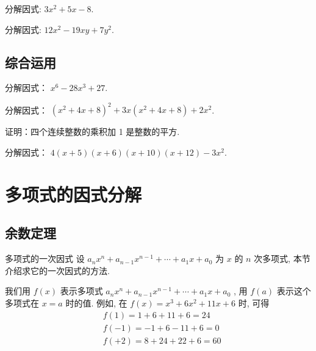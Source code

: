 \documentclass[aspectratio=169]{ctexbeamer}
\theoremstyle{definition}
\begin{document}
\begin{frame}[t]
	\begin{example}
		分解因式: $3 x^{2}+5 x-8$.
	\end{example}
\end{frame}

\begin{frame}[t]
	\begin{example}
		分解因式: $12 x^{2}-19 x y+7 y^{2}$.
	\end{example}
\end{frame}

\subsection{综合运用}
\begin{frame}[t]
	\begin{example}[换元]
		分解因式： $x^{6}-28 x^{3}+27.$
	\end{example}
\end{frame}

\begin{frame}[t]
	\begin{example}
		分解因式： $\left(x^{2}+4 x+8\right)^{2}+3 x\left(x^{2}+4 x+8\right)+2 x^{2}$.
	\end{example}
\end{frame}

\begin{frame}[t]
	\begin{example}
		证明：四个连续整数的乘积加 1 是整数的平方.
	\end{example}
\end{frame}

\begin{frame}[t]
	\begin{example}
		分解因式： $4(x+5)(x+6)(x+10)(x+12)-3 x^{2}.$
	\end{example}
\end{frame}

\section{多项式的因式分解}
\subsection{余数定理}
\begin{frame}{多项式的一次因式}
	设 $a_{n} x^{n}+a_{n-1} x^{n-1}+\cdots+a_{1} x+a_{0}$ 为 $x$ 的 $n$ 次多项式, 本节介绍求它的一次因式的方法.

	我们用 $f(x)$ 表示多项式 $a_{n} x^{n}+a_{n-1} x^{n-1}+\cdots+a_{1} x+a_{0}$ , 用 $f(a)$ 表示这个多项式在 $x=a$ 时的值. 例如, 在 $f(x)=x^{3}+6 x^{2}+11 x+6$ 时, 可得
	\begin{align*}
		 & f(1)=1+6+11+6=24   \\
		 & f(-1)=-1+6-11+6=0  \\
		 & f(+2)=8+24+22+6=60
	\end{align*}
\end{frame}
\end{document}
